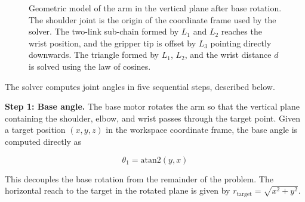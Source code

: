 \begin{figure}[H]
    \caption{Geometric model of the arm in the vertical plane after 
    base rotation. The shoulder joint is the origin of the 
    coordinate frame used by the solver. The two-link sub-chain 
    formed by $L_1$ and $L_2$ reaches the wrist position, and the 
    gripper tip is offset by $L_3$ pointing directly downwards. 
    The triangle formed by $L_1$, $L_2$, and the wrist distance 
    $d$ is solved using the law of cosines.}
    \label{fig:ik_geometry}
\end{figure}

The solver computes joint angles in five sequential steps, 
described below.

\textbf{Step 1: Base angle.} The base motor rotates the arm so 
that the vertical plane containing the shoulder, elbow, and 
wrist passes through the target point. Given a target position 
$(x, y, z)$ in the workspace coordinate frame, the base angle 
is computed directly as

\begin{equation}
    \theta_1 = \mathrm{atan2}(y, x)
\end{equation}

This decouples the base rotation from the remainder of the 
problem. The horizontal reach to the target in the rotated 
plane is given by 
$r_{\mathrm{target}} = \sqrt{x^2 + y^2}$.

